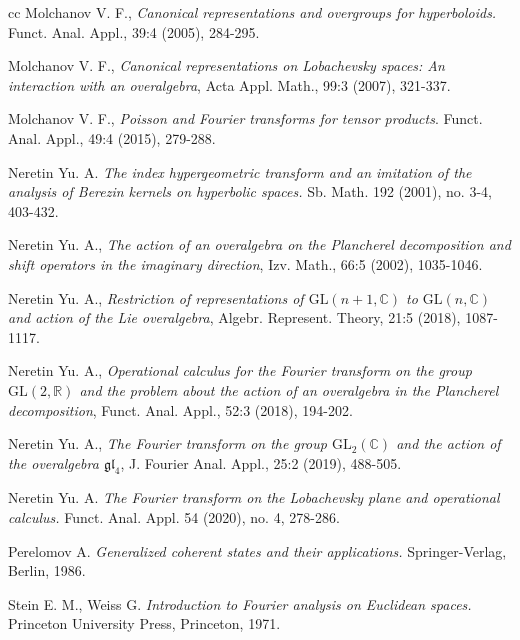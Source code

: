 \documentclass[]{amsart}
\def\GL{\mathrm  {GL}}
\def\R {{\mathbb R }}
\def\C {{\mathbb C }}
\begin{document}
\begin{thebibliography}{cc}
 Molchanov V. F., {\it Canonical representations and overgroups for hyperboloids.} Funct. Anal. Appl., 39:4 (2005), 284-295. 

 Molchanov V. F., {\it Canonical representations on Lobachevsky spaces: An interaction with an overalgebra}, Acta Appl. Math., 99:3 (2007), 321-337.  
 
 Molchanov V. F., {\it Poisson and Fourier transforms for tensor products}. Funct. Anal. Appl., 49:4 (2015), 279-288.


Neretin Yu. A.
{\it The index hypergeometric transform and an imitation of the analysis of Berezin kernels on hyperbolic spaces.}
Sb. Math. 192 (2001), no. 3-4, 403-432.

 Neretin Yu. A., {\it The action of an overalgebra on the Plancherel decomposition and shift operators in the imaginary direction},
 Izv. Math., 66:5 (2002), 1035-1046.
 


 Neretin Yu. A., {\it Restriction of representations of 
 $\GL(n+1,\C)$ to $\GL(n,\C)$ and action of the Lie overalgebra}, Algebr. Represent. Theory, 21:5 (2018), 1087-1117. 
 
 Neretin Yu. A., {\it Operational calculus for the Fourier transform on the group $\GL(2,\R)$ and the problem about the action of an overalgebra in the Plancherel decomposition}, Funct. Anal. Appl., 52:3 (2018), 194-202.  
 
 Neretin Yu. A., {\it The Fourier transform on the group $\GL_2(\C)$
 and the action of the overalgebra $\mathfrak{gl}_4$}, J. Fourier Anal. Appl., 25:2 (2019), 488-505.

Neretin Yu. A.
{\it The Fourier transform on the Lobachevsky plane and operational calculus.} 
Funct. Anal. Appl. 54 (2020), no. 4, 278-286.

Perelomov A.
{\it Generalized coherent states and their applications.}
Springer-Verlag, Berlin, 1986.

Stein E. M., Weiss G.
{\it Introduction to Fourier analysis on Euclidean spaces.} 
Princeton University Press, Princeton,  1971.


\end{thebibliography}
\end{document}
